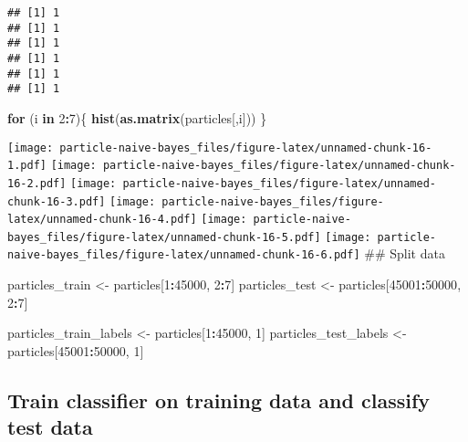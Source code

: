 \documentclass[
]{article}
\newenvironment{Shaded}{\begin{snugshade}}{\end{snugshade}}
\newcommand{\ControlFlowTok}[1]{\textcolor[rgb]{0.13,0.29,0.53}{\textbf{#1}}}
\newcommand{\DecValTok}[1]{\textcolor[rgb]{0.00,0.00,0.81}{#1}}
\newcommand{\KeywordTok}[1]{\textcolor[rgb]{0.13,0.29,0.53}{\textbf{#1}}}
\newcommand{\NormalTok}[1]{#1}
\newcommand{\OperatorTok}[1]{\textcolor[rgb]{0.81,0.36,0.00}{\textbf{#1}}}
\newcommand{\StringTok}[1]{\textcolor[rgb]{0.31,0.60,0.02}{#1}}
\begin{document}
\begin{verbatim}
## [1] 1
## [1] 1
## [1] 1
## [1] 1
## [1] 1
## [1] 1
\end{verbatim}

\begin{Shaded}
\begin{Highlighting}[]
\ControlFlowTok{for}\NormalTok{ (i }\ControlFlowTok{in} \DecValTok{2}\OperatorTok{:}\DecValTok{7}\NormalTok{)\{}
  \KeywordTok{hist}\NormalTok{(}\KeywordTok{as.matrix}\NormalTok{(particles[,i]))}
\NormalTok{\}}
\end{Highlighting}
\end{Shaded}

\texttt{[image: particle-naive-bayes\_files/figure-latex/unnamed-chunk-16-1.pdf]}
\texttt{[image: particle-naive-bayes\_files/figure-latex/unnamed-chunk-16-2.pdf]}
\texttt{[image: particle-naive-bayes\_files/figure-latex/unnamed-chunk-16-3.pdf]}
\texttt{[image: particle-naive-bayes\_files/figure-latex/unnamed-chunk-16-4.pdf]}
\texttt{[image: particle-naive-bayes\_files/figure-latex/unnamed-chunk-16-5.pdf]}
\texttt{[image: particle-naive-bayes\_files/figure-latex/unnamed-chunk-16-6.pdf]}
\#\# Split data

\begin{Shaded}
\begin{Highlighting}[]
\NormalTok{particles_train <-}\StringTok{ }\NormalTok{particles[}\DecValTok{1}\OperatorTok{:}\DecValTok{45000}\NormalTok{, }\DecValTok{2}\OperatorTok{:}\DecValTok{7}\NormalTok{]}
\NormalTok{particles_test <-}\StringTok{ }\NormalTok{particles[}\DecValTok{45001}\OperatorTok{:}\DecValTok{50000}\NormalTok{, }\DecValTok{2}\OperatorTok{:}\DecValTok{7}\NormalTok{]}

\NormalTok{particles_train_labels <-}\StringTok{ }\NormalTok{particles[}\DecValTok{1}\OperatorTok{:}\DecValTok{45000}\NormalTok{, }\DecValTok{1}\NormalTok{]}
\NormalTok{particles_test_labels <-}\StringTok{ }\NormalTok{particles[}\DecValTok{45001}\OperatorTok{:}\DecValTok{50000}\NormalTok{, }\DecValTok{1}\NormalTok{]}
\end{Highlighting}
\end{Shaded}

\hypertarget{train-classifier-on-training-data-and-classify-test-data-2}{%
\subsection{Train classifier on training data and classify test
data}\label{train-classifier-on-training-data-and-classify-test-data-2}}
\end{document}
